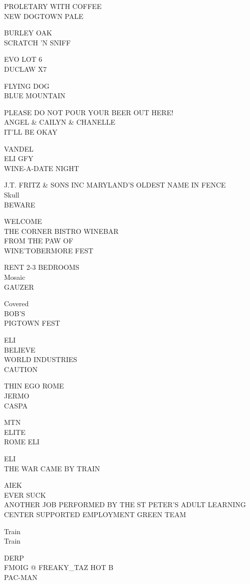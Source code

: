\documentclass[10pt,letterpaper]{article}
\begin{document}
PROLETARY WITH COFFEE\\
NEW DOGTOWN PALE

BURLEY OAK\\
SCRATCH 'N SNIFF

EVO LOT 6\\
DUCLAW X7

FLYING DOG\\
BLUE MOUNTAIN

PLEASE DO NOT POUR YOUR BEER OUT HERE!\\
ANGEL \& CAILYN \& CHANELLE\\
IT'LL BE OKAY

VANDEL\\
ELI GFY\\
WINE{-}A{-}DATE NIGHT

J.T. FRITZ \& SONS INC MARYLAND'S OLDEST NAME IN FENCE\\
Skull\\
BEWARE

WELCOME\\
THE CORNER BISTRO WINEBAR\\
FROM THE PAW OF\\
WINE'TOBERMORE FEST

RENT 2{-}3 BEDROOMS\\
Mosaic\\
GAUZER

Covered\\
BOB'S\\
PIGTOWN FEST

ELI\\
BELIEVE\\
WORLD INDUSTRIES\\
CAUTION

THIN EGO ROME\\
JERMO\\
CASPA

MTN\\
ELITE\\
ROME ELI

ELI\\
THE WAR CAME BY TRAIN

AIEK\\
EVER SUCK\\
ANOTHER JOB PERFORMED BY THE ST PETER'S ADULT LEARNING CENTER SUPPORTED EMPLOYMENT GREEN TEAM

Train\\
Train

DERP\\
FMOIG @ FREAKY\_TAZ HOT B\\
PAC{-}MAN
\end{document}
